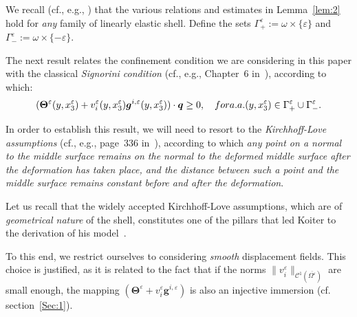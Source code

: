 \documentclass{amsart}
\begin{document}
We recall (cf., e.g., \cite{Ciarlet2000}) that the various relations and estimates in Lemma~\ref{lem:2} hold for \emph{any} family of linearly elastic shell. Define the sets $\Gamma^\varepsilon_{+}:=\omega\times\{\varepsilon\}$ and $\Gamma^\varepsilon_{-}:=\omega\times\{-\varepsilon\}$.

The next result relates the confinement condition we are considering in this paper with the classical \emph{Signorini condition} (cf., e.g., Chapter~6 in~\cite{KikuchiOden1988}), according to which:
\begin{equation*}
	(\bm{\Theta}^\varepsilon(y,x_3^\varepsilon) +v_i^\varepsilon(y,x_3^\varepsilon)\bm{g}^{i,\varepsilon}(y,x_3^\varepsilon)) \cdot\bm{q} \ge 0, \quad\textup{ for a.a. }(y,x_3^\varepsilon) \in \Gamma^\varepsilon_+ \cup \Gamma^\varepsilon_{-}.
\end{equation*}

In order to establish this result, we will need to resort to the \emph{Kirchhoff-Love assumptions} (cf., e.g., page~336 in~\cite{Ciarlet2000}), according to which \emph{any point on a normal to the middle surface remains on the normal to the deformed middle surface after the deformation has taken place, and the distance between such a point and the middle surface remains constant before and after the deformation}. 

Let us recall that the widely accepted Kirchhoff-Love assumptions, which are of \emph{geometrical nature} of the shell, constitutes one of the pillars that led Koiter to the derivation of his model~\cite{Koiter,Koiter1970}.

To this end, we restrict ourselves to considering \emph{smooth} displacement fields. This choice is justified, as it is related to the fact that if the norms $\|v^\varepsilon_i\|_{\mathcal{C}^1(\overline{\Omega^\varepsilon})}$ are small enough, the mapping $(\bm{\Theta}^\varepsilon + v^\varepsilon_i \bm{g}^{i,\varepsilon})$ is also an injective immersion (cf. section~\ref{Sec:1}).
\end{document}
